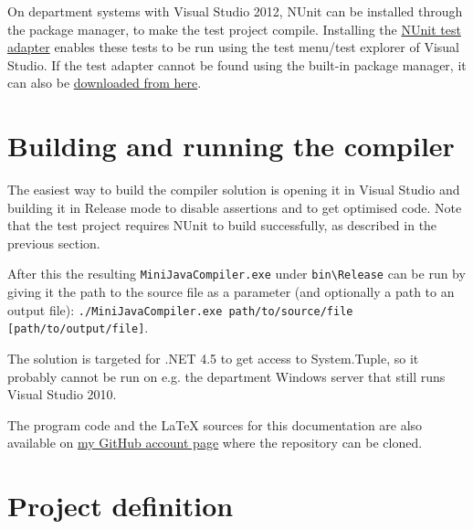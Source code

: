 \documentclass[a4paper,11pt]{article}
\begin{document}
On department systems with Visual Studio 2012, NUnit can be installed through the package manager, to make the test project compile. Installing the \href{http://nunit.org/index.php?p=vsTestAdapter&r=2.6.1}{NUnit test adapter} enables these tests to be run using the test menu/test explorer of Visual Studio. If the test adapter cannot be found using the built-in package manager, it can also be \href{http://visualstudiogallery.msdn.microsoft.com/6ab922d0-21c0-4f06-ab5f-4ecd1fe7175d}{downloaded from here}.

\section{Building and running the compiler}

The easiest way to build the compiler solution is opening it in Visual Studio and building it in Release mode to disable assertions and to get optimised code. Note that the test project requires NUnit to build successfully, as described in the previous section.

After this the resulting \verb,MiniJavaCompiler.exe, under \verb,bin\Release, can be run by giving it the path to the source file as a parameter (and optionally a path to an output file): \verb,./MiniJavaCompiler.exe path/to/source/file [path/to/output/file],.

The solution is targeted for .NET 4.5 to get access to System.Tuple, so it probably cannot be run on e.g. the department Windows server that still runs Visual Studio 2010.

The program code and the \LaTeX{} sources for this documentation are also available on \href{https://github.com/Lateks/MiniJavaCompiler}{my GitHub account page} where the repository can be cloned.


\appendix
\section{Project definition}
\end{document}
